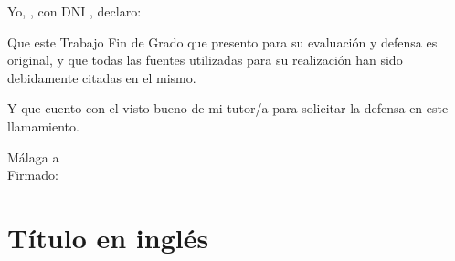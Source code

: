 \documentclass[13pt,a4paper]{report}
\begin{document}

\vspace{12pt}

Yo, \makebox[2cm]{\dotfill}, con DNI  \makebox[2cm]{\dotfill}, declaro:  %

\vspace{12pt}

Que este Trabajo Fin de Grado que presento para su evaluación y defensa es original, y que todas las fuentes utilizadas para su realización han sido debidamente citadas en el mismo. 

\vspace{12pt}

Y que cuento con el visto bueno de mi tutor/a para solicitar la defensa en este llamamiento.
\begin{flushright}
    Málaga a  \makebox[2cm]{\dotfill} \\ %
    \vspace{5cm}
     Firmado: \makebox[5cm]{\dotfill} %
\end{flushright}



\newpage
{} %

\renewcommand{\contentsname}{ÍNDICE} 
\clearpage
\tableofcontents

\newpage 

\pagestyle{fancy}
\fancyhf{}
\fancyfoot[C]{\fontsize{13pt}{15pt}\selectfont\thepage} %


\section{Título en inglés}

\vspace{12pt}
\end{document}
